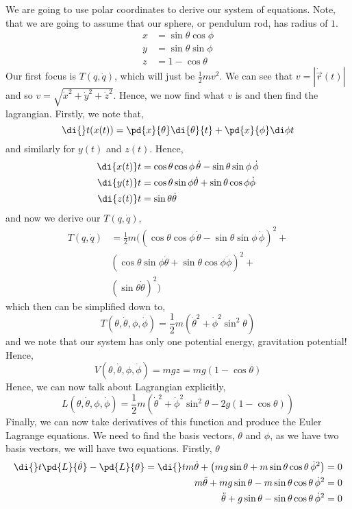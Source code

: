 We are going to use polar coordinates to derive our system of equations. Note, that we are going to assume that our sphere, or pendulum rod, has radius of $1$.
\begin{align*}
  x &= \sin \theta \cos\phi \\
  y &= \sin\theta\sin\phi\\
  z &= 1 - \cos\theta
\end{align*}
Our first focus is $T(q, \dot q)$, which will just be $\frac{1}{2}mv^2$. We can see that $v = |\dot{\vec{r}}(t)|$ and so $v = \sqrt{\dot x^2 + \dot y^2 + \dot z^2}$. Hence, we now find what $v$ is and then find the lagrangian. Firstly, we note that,
$$ \di {} t (x(t)) = \pd{x}{\theta}\di {\theta}{t} + \pd{x}{\phi}\di \phi t $$
and similarly for $y(t)$ and $z(t)$. Hence,
\begin{align*}
  \di {x(t)} t &= \cos \theta \cos \phi \,\dot \theta - \sin \theta \sin \phi \,\dot \phi\\
  \di {y(t)} t &= \cos \theta\sin\phi \dot \theta + \sin \theta\cos \phi \dot \phi\\
  \di {z(t)} t &= \sin \theta\dot \theta
\end{align*}
and now we derive our $T(q, \dot q)$,
\begin{align*}
  T(q, \dot q) &= \frac{1}{2}m \bigg( \left(\cos \theta \cos \phi \,\dot \theta - \sin \theta \sin \phi \,\dot \phi\right)^2 + \\
  & \left( \cos \theta\sin\phi \dot \theta + \sin \theta\cos \phi \dot \phi \right)^2 + \\
  & \left( \sin \theta\dot \theta \right)^2 \bigg)
\end{align*}
which then can be simplified down to,
$$ T(\theta, \dot \theta, \phi, \dot \phi) = \frac{1}{2}m\left( \dot \theta^2 + \dot \phi ^2\sin^2 \theta \right) $$
and we note that our system has only one potential energy, gravitation potential! Hence,
$$ V(\theta, \dot \theta, \phi, \dot \phi) = mgz = mg(1 - \cos \theta) $$
Hence, we can now talk about Lagrangian explicitly,
$$ L(\theta, \dot \theta, \phi, \dot \phi) = \frac{1}{2}m \left( \dot \theta^2 + \dot\phi^2\sin^2 \theta - 2g\left(1 - \cos \theta\right) \right) $$
Finally, we can now take derivatives of this function and produce the Euler Lagrange equations. We need to find the basis vectors, $\theta$ and $\phi$, as we have two basis vectors, we will have two equations. Firstly, $\theta$
\begin{align*}
  \di {} t \pd{L}{\dot\theta} - \pd{L}{\theta} = \di {} t {m \dot \theta} + \left( mg\sin\theta + m\sin \theta \cos \theta \,\dot\phi^2 \right) &= 0\\
  m\ddot{\theta} + mg\sin \theta - m\sin \theta \cos \theta\,\dot \phi^2  &= 0\\
  \ddot{\theta} + g\sin \theta - \sin \theta \cos \theta\,\dot \phi^2  &= 0\\
\end{align*}
